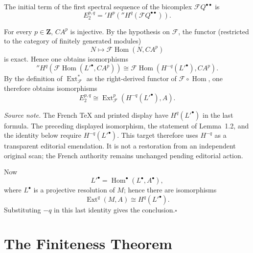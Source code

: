 \documentclass[11pt,a4paper,oneside]{book}
\providecommand{\ZZ}{\mathbf Z}
\providecommand{\cF}{\mathcal F}
\providecommand{\calF}{\mathcal F}
\theoremstyle{plain}
\theoremstyle{definition}
\theoremstyle{remark}
\begin{document}

The initial term of the first spectral sequence of the bicomplex
$\cF Q^{\bullet\bullet}$ is
\[
  E_2^{p,q}
  ={}'\!H^p({}''\!H^q(\cF Q^{\bullet\bullet})).
\]

For every $p\in\ZZ$, $CA^p$ is injective. By the hypothesis on $\cF$, the
functor (restricted to the category of finitely generated modules)
\[
  N\longmapsto \cF\operatorname{Hom}(N,CA^p)
\]
is exact. Hence one obtains isomorphisms
\[
  {}''\!H^q(\cF\operatorname{Hom}({L'}^\bullet,CA^p))
  \cong
  \cF\operatorname{Hom}(H^{-q}({L'}^\bullet),CA^p).
\]
By the definition of $\operatorname{Ext}^{\ast}_{\cF}$ as the right-derived functor
of $\cF\circ\operatorname{Hom}$, one therefore obtains isomorphisms
\[
  E_2^{p,q}
  \cong
  \operatorname{Ext}^{p}_{\cF}(H^{-q}({L'}^\bullet),A).
\]

\noindent\emph{Source note.} The French TeX and printed display have
$H^q({L'}^\bullet)$ in the last formula. The preceding displayed
isomorphism, the statement of Lemma~1.2, and the identity below require
$H^{-q}({L'}^\bullet)$. This target therefore uses $H^{-q}$ as a transparent
editorial emendation. It is not a restoration from an independent original
scan; the French authority remains unchanged pending editorial action.

Now
\[
  {L'}^\bullet=\operatorname{Hom}^\bullet(L^\bullet,A^\bullet),
\]
where $L^\bullet$ is a projective resolution of $M$; hence there are
isomorphisms
\[
  \operatorname{Ext}^{q}(M,A)\cong H^q({L'}^\bullet).
\]
Substituting $-q$ in this last identity gives the conclusion.\hfill$\square$


\let\cF\calF\renewcommand{\theequation}{\thesection.\arabic{equation}}

\setcounter{section}{1}
\section{The Finiteness Theorem}\label{VIII.2}
\end{document}
